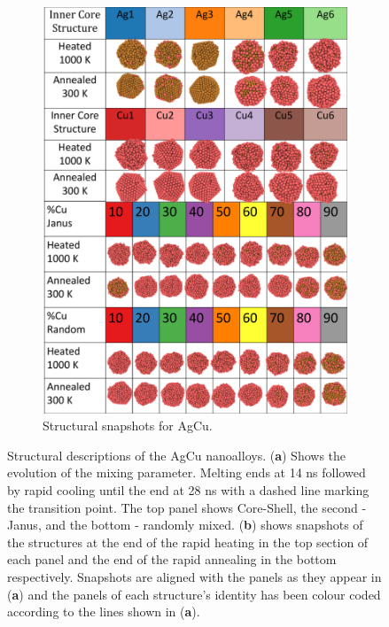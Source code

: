 \begin{figure}
\begin{subfigure}{0.39\textwidth}
\end{subfigure}
\begin{subfigure}{0.56\textwidth}
    \includegraphics[width=\linewidth]{figures/MD/Alloys/AgCu_Struts.pdf}
    \caption{Structural snapshots for AgCu.}
    \label{fig:AgCu_Struts}
\end{subfigure}
    \caption{Structural descriptions of the AgCu nanoalloys. (\textbf{a}) Shows the evolution of the mixing parameter. Melting ends at 14 ns followed by rapid cooling until the end at 28 ns with a dashed line marking the transition point. The top panel shows Core-Shell, the second - Janus, and the bottom - randomly mixed. (\textbf{b}) shows snapshots of the structures at the end of the rapid heating in the top section of each panel and the end of the rapid annealing in the bottom respectively. Snapshots are aligned with the panels as they appear in (\textbf{a}) and the panels of each structure's identity has been colour coded according to the lines shown in (\textbf{a}).}
    \label{fig:AgCu_NA}
\end{figure}


